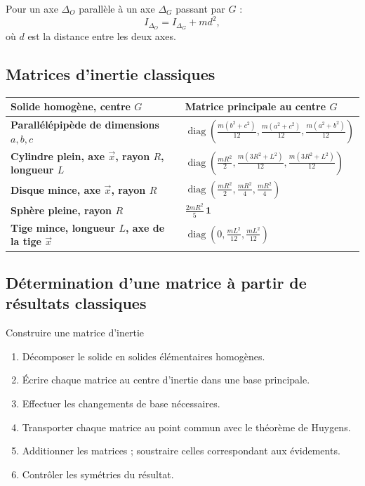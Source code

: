 Pour un axe $\Delta_O$ parallèle à un axe $\Delta_G$ passant par $G$ :
\[
I_{\Delta_O}=I_{\Delta_G}+md^2,
\]
où $d$ est la distance entre les deux axes.

\subsection{Matrices d'inertie classiques}

\begin{center}
\small
\begin{tabularx}{\linewidth}{>{\bfseries}l X}
\toprule
Solide homogène, centre $G$ & Matrice principale au centre $G$ \\
\midrule
Parallélépipède de dimensions $a,b,c$ &
$\displaystyle\operatorname{diag}\!\left(\frac{m(b^2+c^2)}{12},\frac{m(a^2+c^2)}{12},\frac{m(a^2+b^2)}{12}\right)$ \\
Cylindre plein, axe $\vec x$, rayon $R$, longueur $L$ &
$\displaystyle\operatorname{diag}\!\left(\frac{mR^2}{2},\frac{m(3R^2+L^2)}{12},\frac{m(3R^2+L^2)}{12}\right)$ \\
Disque mince, axe $\vec x$, rayon $R$ &
$\displaystyle\operatorname{diag}\!\left(\frac{mR^2}{2},\frac{mR^2}{4},\frac{mR^2}{4}\right)$ \\
Sphère pleine, rayon $R$ &
$\displaystyle\frac{2mR^2}{5}\,\mathbf 1$ \\
Tige mince, longueur $L$, axe de la tige $\vec x$ &
$\displaystyle\operatorname{diag}\!\left(0,\frac{mL^2}{12},\frac{mL^2}{12}\right)$ \\
\bottomrule
\end{tabularx}
\end{center}

\subsection{Détermination d'une matrice à partir de résultats classiques}

\begin{TLMethod}{Construire une matrice d'inertie}
\begin{enumerate}
  \item Décomposer le solide en solides élémentaires homogènes.
  \item Écrire chaque matrice au centre d'inertie dans une base principale.
  \item Effectuer les changements de base nécessaires.
  \item Transporter chaque matrice au point commun avec le théorème de Huygens.
  \item Additionner les matrices ; soustraire celles correspondant aux évidements.
  \item Contrôler les symétries du résultat.
\end{enumerate}
\end{TLMethod}


